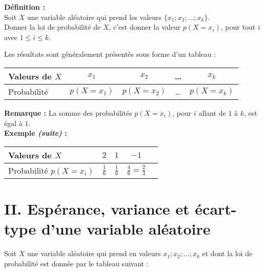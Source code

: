 \documentclass[11pt,a4paper]{article}
\begin{document}
\begin{mdframed}[style=definitionStyle]
    \textbf{Définition :} ~\\
    Soit $X$ une variable aléatoire qui prend les valeurs $\{x_1;x_2;\dots;x_k\}$. \\
    Donner la loi de probabilité de $X$, c'est donner la valeur $p(X=x_i)$, pour tout $i$ avec $1\leq i\leq k$.
    \vspace*{4pt}

    Les résultats sont généralement présentés sous forme d'un tableau : \\
    \vspace*{-8pt}

    \renewcommand{\arraystretch}{1.6}
    \begin{tabular}{|l|c|c|c|c|}
        \hline
        Valeurs de $X$ & $x_1$      & $x_2$      & \quad\text{ }\dots\quad\text{ } & $x_k$      \\
        \hline
        Probabilité      & $p(X=x_1)$ & $p(X=x_2)$ & \quad\text{ }\dots\quad\text{ } & $p(X=x_k)$ \\
        \hline
    \end{tabular}
\end{mdframed}

\textbf{Remarque :} La somme des probabilités $p(X=x_i)$, pour $i$ allant de $1$ à $k$, est égal à $1$. \\

\textbf{Exemple \emph{(suite)} :} ~\\
\renewcommand{\arraystretch}{2}
\begin{tabular}{|l|c|c|c|c|}
    \hline
    Valeurs de $X$      & $2$                        & $1$                        & $-1$                                   \\
    \hline
    Probabilité  $p(X=x_i)$ & $\displaystyle\frac{1}{6}$ & $\displaystyle\frac{1}{6}$ & $\displaystyle\frac{4}{6}=\frac{2}{3}$ \\
    \hline
\end{tabular}

\newpage

\section*{II. Espérance, variance et écart-type d'une variable aléatoire}

Soit $X$ une variable aléatoire qui prend en valeurs ${x_1;x_2;\dots;x_k}$ et dont la loi de probabilité est donnée par le tableau suivant :
\vspace{-12pt}
\end{document}
